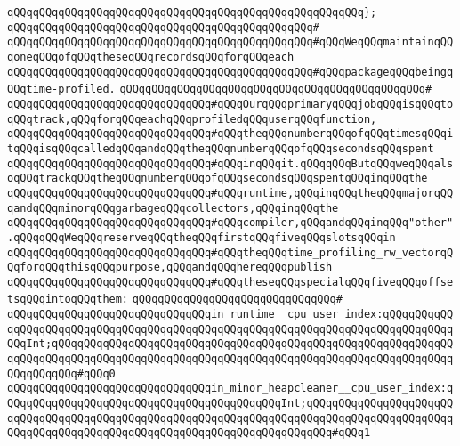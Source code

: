 \verb|qQQqqQQqqQQqqQQqqQQqqQQqqQQqqQQqqQQqqQQqqQQqqQQqqQQqqQQq};|\newline
\verb|qQQqqQQqqQQqqQQqqQQqqQQqqQQqqQQqqQQqqQQqqQQqqQQq#|\newline
\verb|qQQqqQQqqQQqqQQqqQQqqQQqqQQqqQQqqQQqqQQqqQQqqQQq#qQQqWeqQQqmaintainqQQqoneqQQqofqQQqtheseqQQqrecordsqQQqforqQQqeach|\newline
\verb|qQQqqQQqqQQqqQQqqQQqqQQqqQQqqQQqqQQqqQQqqQQqqQQq#qQQqpackageqQQqbeingqQQqtime-profiled.|\newline
\verb|qQQqqQQqqQQqqQQqqQQqqQQqqQQqqQQqqQQqqQQqqQQqqQQq#|\newline
\newline
\newline
\verb|qQQqqQQqqQQqqQQqqQQqqQQqqQQqqQQq#qQQqOurqQQqprimaryqQQqjobqQQqisqQQqtoqQQqtrack,qQQqforqQQqeachqQQqprofiledqQQquserqQQqfunction,|\newline
\verb|qQQqqQQqqQQqqQQqqQQqqQQqqQQqqQQq#qQQqtheqQQqnumberqQQqofqQQqtimesqQQqitqQQqisqQQqcalledqQQqandqQQqtheqQQqnumberqQQqofqQQqsecondsqQQqspent|\newline
\verb|qQQqqQQqqQQqqQQqqQQqqQQqqQQqqQQq#qQQqinqQQqit.qQQqqQQqButqQQqweqQQqalsoqQQqtrackqQQqtheqQQqnumberqQQqofqQQqsecondsqQQqspentqQQqinqQQqthe|\newline
\verb|qQQqqQQqqQQqqQQqqQQqqQQqqQQqqQQq#qQQqruntime,qQQqinqQQqtheqQQqmajorqQQqandqQQqminorqQQqgarbageqQQqcollectors,qQQqinqQQqthe|\newline
\verb|qQQqqQQqqQQqqQQqqQQqqQQqqQQqqQQq#qQQqcompiler,qQQqandqQQqinqQQq"other".qQQqqQQqWeqQQqreserveqQQqtheqQQqfirstqQQqfiveqQQqslotsqQQqin|\newline
\verb|qQQqqQQqqQQqqQQqqQQqqQQqqQQqqQQq#qQQqtheqQQqtime_profiling_rw_vectorqQQqforqQQqthisqQQqpurpose,qQQqandqQQqhereqQQqpublish|\newline
\verb|qQQqqQQqqQQqqQQqqQQqqQQqqQQqqQQq#qQQqtheseqQQqspecialqQQqfiveqQQqoffsetsqQQqintoqQQqthem:|\newline
\verb|qQQqqQQqqQQqqQQqqQQqqQQqqQQqqQQq#|\newline
\verb|qQQqqQQqqQQqqQQqqQQqqQQqqQQqqQQqin_runtime__cpu_user_index:qQQqqQQqqQQqqQQqqQQqqQQqqQQqqQQqqQQqqQQqqQQqqQQqqQQqqQQqqQQqqQQqqQQqqQQqqQQqqQQqqQQqInt;qQQqqQQqqQQqqQQqqQQqqQQqqQQqqQQqqQQqqQQqqQQqqQQqqQQqqQQqqQQqqQQqqQQqqQQqqQQqqQQqqQQqqQQqqQQqqQQqqQQqqQQqqQQqqQQqqQQqqQQqqQQqqQQqqQQqqQQqqQQqqQQq#qQQq0|\newline
\verb|qQQqqQQqqQQqqQQqqQQqqQQqqQQqqQQqin_minor_heapcleaner__cpu_user_index:qQQqqQQqqQQqqQQqqQQqqQQqqQQqqQQqqQQqqQQqqQQqInt;qQQqqQQqqQQqqQQqqQQqqQQqqQQqqQQqqQQqqQQqqQQqqQQqqQQqqQQqqQQqqQQqqQQqqQQqqQQqqQQqqQQqqQQqqQQqqQQqqQQqqQQqqQQqqQQqqQQqqQQqqQQqqQQqqQQqqQQqqQQqqQQq#qQQq1|\newline
